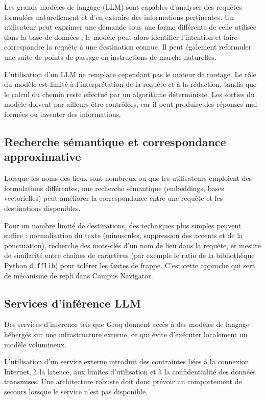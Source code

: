 \documentclass[12pt,a4paper]{report}
\begin{document}
Les grands modèles de langage (LLM) sont capables d'analyser des requêtes formulées naturellement
et d'en extraire des informations pertinentes. Un utilisateur peut exprimer une demande sous une
forme différente de celle utilisée dans la base de données ; le modèle peut alors identifier
l'intention et faire correspondre la requête à une destination connue. Il peut également
reformuler une suite de points de passage en instructions de marche naturelles.

L'utilisation d'un LLM ne remplace cependant pas le moteur de routage. Le rôle du modèle est limité
à l'interprétation de la requête et à la rédaction, tandis que le calcul du chemin reste effectué
par un algorithme déterministe. Les sorties du modèle doivent par ailleurs être contrôlées, car il
peut produire des réponses mal formées ou inventer des informations.

\subsection{Recherche sémantique et correspondance approximative}

Lorsque les noms des lieux sont nombreux ou que les utilisateurs emploient des formulations
différentes, une recherche sémantique (embeddings, bases vectorielles) peut améliorer la
correspondance entre une requête et les destinations disponibles.

Pour un nombre limité de destinations, des techniques plus simples peuvent suffire : normalisation
du texte (minuscules, suppression des accents et de la ponctuation), recherche des mots-clés d'un
nom de lieu dans la requête, et mesure de similarité entre chaînes de caractères (par exemple le
ratio de la bibliothèque Python \texttt{difflib}) pour tolérer les fautes de frappe. C'est cette
approche qui sert de mécanisme de repli dans Campus Navigator.

\subsection{Services d'inférence LLM}

Des services d'inférence tels que Groq donnent accès à des modèles de langage hébergés sur une
infrastructure externe, ce qui évite d'exécuter localement un modèle volumineux.

L'utilisation d'un service externe introduit des contraintes liées à la connexion Internet, à la
latence, aux limites d'utilisation et à la confidentialité des données transmises. Une
architecture robuste doit donc prévoir un comportement de secours lorsque le service n'est pas
disponible.
\end{document}
